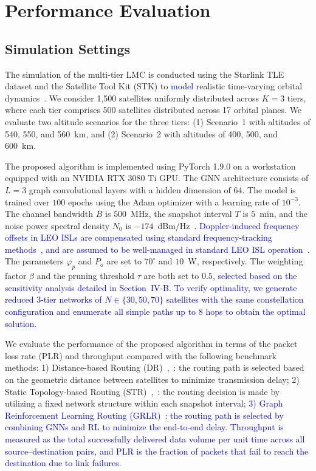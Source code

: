 \section{Performance Evaluation}

\subsection{Simulation Settings}

The simulation of the multi-tier LMC is conducted using the Starlink TLE dataset and the Satellite Tool Kit (STK) to \textcolor{blue}{model} realistic time-varying orbital dynamics~\cite{luan2024fast}. We consider 1,500 satellites uniformly distributed across $K=3$ tiers, where each tier comprises 500 satellites distributed across 17 orbital planes. We evaluate two altitude scenarios for the three tiers: (1) Scenario~1 with altitudes of 540, 550, and 560~km, and (2) Scenario~2 with altitudes of 400, 500, and 600~km.

The proposed algorithm is implemented using PyTorch 1.9.0 on a workstation equipped with an NVIDIA RTX 3080 Ti GPU. The GNN architecture consists of $L=3$ graph convolutional layers with a hidden dimension of $64$. The model is trained over $100$ epochs using the Adam optimizer with a learning rate of $10^{-3}$. The channel bandwidth $B$ is $500$~MHz, the snapshot interval $T$ is $5$~min, and the noise power spectral density $N_0$ is $-174$~dBm/Hz~\cite{han2023time}. \textcolor{blue}{Doppler-induced frequency offsets in LEO ISLs are compensated using standard frequency-tracking methods~\cite{darsena2024hybrid}, and are assumed to be well-managed in standard LEO ISL operation~\cite{cao2025dense}.} The parameters $\varphi_p$ and $P_o$ are set to $70^\circ$ and $10$~W, respectively. The weighting factor $\beta$ and the pruning threshold $\tau$ are both set to $0.5$\textcolor{blue}{, selected based on the sensitivity analysis detailed in Section~IV-B}. \textcolor{blue}{To verify optimality, we generate reduced 3-tier networks of $N \in \{30, 50, 70\}$ satellites with the same constellation configuration and enumerate all simple paths up to 8 hops to obtain the optimal solution.}

We evaluate the performance of the proposed algorithm in terms of the packet loss rate (PLR) and throughput compared with the following benchmark methods:
1) Distance-based Routing (DR)~\cite{wang2023reliability},~\cite{hu2022software}: the routing path is selected based on the geometric distance between satellites to minimize transmission delay;
2) Static Topology-based Routing (STR)~\cite{yan2024logic},~\cite{huang2026dynamic}: the routing decision is made by utilizing a fixed network structure within each snapshot interval;
\textcolor{blue}{3) Graph Reinforcement Learning Routing (GRLR)~\cite{zhang2025grlr}: the routing path is selected by combining GNNs and RL to minimize the end-to-end delay.}
\textcolor{blue}{Throughput is measured as the total successfully delivered data volume per unit time across all source--destination pairs, and PLR is the fraction of packets that fail to reach the destination due to link failures.}

